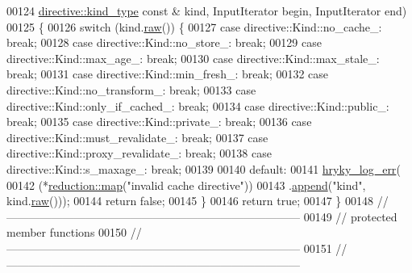 \begin{DoxyCode}
00124     \hyperlink{classhryky_1_1_kind}{directive::kind_type} \textcolor{keyword}{const} & kind, InputIterator begin, InputIterator end)
00125 \{
00126     \textcolor{keywordflow}{switch} (kind.\hyperlink{classhryky_1_1_kind_a092c3dbb200b1fc4e83bebff274ba23e}{raw}()) \{
00127     \textcolor{keywordflow}{case} directive::Kind::no\_cache\_: \textcolor{keywordflow}{break};
00128     \textcolor{keywordflow}{case} directive::Kind::no\_store\_: \textcolor{keywordflow}{break};
00129     \textcolor{keywordflow}{case} directive::Kind::max\_age\_: \textcolor{keywordflow}{break};
00130     \textcolor{keywordflow}{case} directive::Kind::max\_stale\_: \textcolor{keywordflow}{break};
00131     \textcolor{keywordflow}{case} directive::Kind::min\_fresh\_: \textcolor{keywordflow}{break};
00132     \textcolor{keywordflow}{case} directive::Kind::no\_transform\_: \textcolor{keywordflow}{break};
00133     \textcolor{keywordflow}{case} directive::Kind::only\_if\_cached\_: \textcolor{keywordflow}{break};
00134     \textcolor{keywordflow}{case} directive::Kind::public\_: \textcolor{keywordflow}{break};
00135     \textcolor{keywordflow}{case} directive::Kind::private\_: \textcolor{keywordflow}{break};
00136     \textcolor{keywordflow}{case} directive::Kind::must\_revalidate\_: \textcolor{keywordflow}{break};
00137     \textcolor{keywordflow}{case} directive::Kind::proxy\_revalidate\_: \textcolor{keywordflow}{break};
00138     \textcolor{keywordflow}{case} directive::Kind::s\_maxage\_: \textcolor{keywordflow}{break};
00139 
00140     \textcolor{keywordflow}{default}:
00141         \hyperlink{log__writer__common_8h_ae5ad3dabb33f594695ef40753cb78aad}{hryky_log_err}(
00142             (*\hyperlink{namespacehryky_1_1reduction_ac5eae270cf8047b294dc4ff3e5e11a79}{reduction::map}(\textcolor{stringliteral}{"invalid cache directive"}))
00143             .\hyperlink{classhryky_1_1http_1_1header_1_1cache_1_1control_1_1_entity_ab9a90afb6b1ed5125e7e7648f910f8f7}{append}(\textcolor{stringliteral}{"kind"}, kind.\hyperlink{classhryky_1_1_kind_a092c3dbb200b1fc4e83bebff274ba23e}{raw}()));
00144         \textcolor{keywordflow}{return} \textcolor{keyword}{false};
00145     \}
00146     \textcolor{keywordflow}{return} \textcolor{keyword}{true};
00147 \}
00148 \textcolor{comment}{//
      ------------------------------------------------------------------------------}
00149 \textcolor{comment}{// protected member functions}
00150 \textcolor{comment}{//
      ------------------------------------------------------------------------------}
00151 \textcolor{comment}{//
      ------------------------------------------------------------------------------}

\end{DoxyCode}
